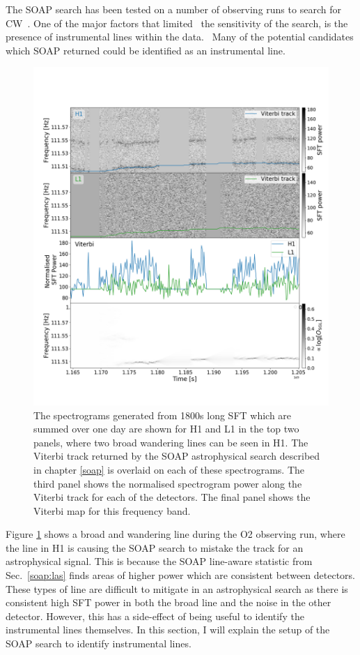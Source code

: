% 
The SOAP search has been tested on a number of observing runs
to search for \gls{CW}~.  One of the major factors that
limited~ the sensitivity
of the search, is the presence of instrumental lines within the
data.~  Many of
the potential candidates which SOAP returned could be identified as an
instrumental line.
%
\begin{figure}[hp]
	\includegraphics[width=\textwidth]{C6_detchar/plot_F111_5_wandering_line.png}
        \caption[Broad wandering line example.]{ The spectrograms generated from 1800s long \gls{SFT} which are summed over one day are shown for H1 and L1 in the top two panels, where two broad wandering lines can be seen in H1.
        The Viterbi track returned by the SOAP astrophysical search described in chapter \ref{soap} is overlaid on each of these spectrograms.
        The third panel shows the normalised spectrogram power along the Viterbi track for each of the detectors. The final
        panel shows the Viterbi map for this frequency band.
			}
\label{detchar:soap:astrowander}

\end{figure}
%
Figure \ref{detchar:soap:astrowander} shows a broad and wandering line during the O2 observing run, where the line in H1 is causing the SOAP search to mistake the track for an astrophysical signal.
This is because the SOAP line-aware statistic from Sec.~\ref{soap:las} finds
areas of higher power which are consistent between detectors. These types of line are difficult to mitigate in an astrophysical
search as there is consistent high \gls{SFT} power in both the broad line and the noise in the other detector.
However, this has a side-effect of being useful to identify the
instrumental lines themselves.
In this section, I will explain the setup of the SOAP search to identify
instrumental lines.

